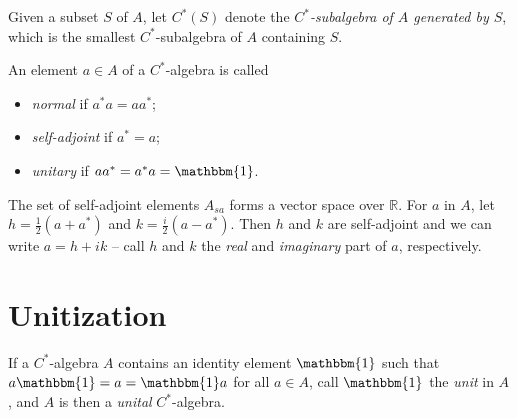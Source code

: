 \documentclass[12pt,a4paper]{report}
\theoremstyle{plain}
\theoremstyle{definition}
\newcommand{\1}{\mathbbm{1}}
\newcommand{\R}{\mathbb{R}}
\begin{document}
Given a subset $S$ of $A$, let $C^\ast(S)$ denote the \emph{$C^\ast$-subalgebra
of $A$ generated by $S$}, which is the smallest $C^\ast$-subalgebra of $A$ containing $S$.

An element $a\in A$ of a $C^\ast$-algebra is called
\begin{itemize}
	\item	\emph{normal} if $a^\ast a=aa^\ast$;
	\item 	\emph{self-adjoint} if $a^\ast=a$;
	\item 	\emph{unitary} if $aa^\ast=a^\ast a = \1$.
\end{itemize}
The set of self-adjoint elements $A_{sa}$ forms a vector space over $\R$.
For $a$ in $A$, let $h=\tfrac{1}{2}(a+a^\ast)$ and $k=\tfrac{i}{2}(a-a^\ast)$. Then $h$ and $k$ are 
self-adjoint and we can write $a=h+ik$ -- call $h$ and $k$ the \emph{real} and \emph{imaginary} part of
$a$, respectively.



\section{Unitization}
If a $C^\ast$-algebra $A$ contains an identity element $\1$ such that 
$a \1 = a = \1  a$ for all $a \in A$, call $\1$ the \emph{unit} 
in $A$, and $A$ is then a \emph{unital} $C^\ast$-algebra.
\end{document}
